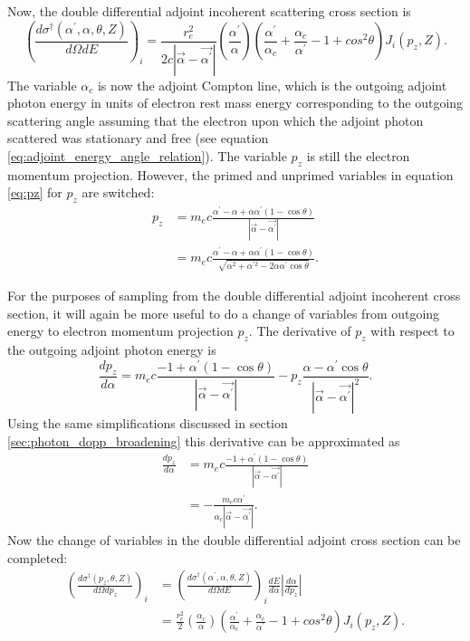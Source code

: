 Now, the double differential adjoint incoherent scattering cross section is
\begin{equation}
  \left(\frac{d\sigma^{\dagger}(\alpha^{'},\alpha,\theta,Z)}{d\Omega dE}
  \right)_i = \frac{r_e^2}{2c\left|\vec{\alpha}-\vec{\alpha^{'}}\right|}
  \left(\frac{\alpha^{'}}{\alpha}\right)\left(\frac{\alpha^{'}}{\alpha_c} +
  \frac{\alpha_c}{\alpha^{'}} - 1 + cos^2\theta \right) J_i(p_z,Z).
\end{equation}
The variable $\alpha_c$ is now the adjoint Compton line, which is the outgoing
adjoint photon energy in units of electron rest mass energy corresponding to
the outgoing scattering angle assuming that the electron upon which the adjoint
photon scattered was stationary and free (see equation 
\ref{eq:adjoint_energy_angle_relation}). The variable $p_z$ is still the 
electron momentum projection. However, the primed and unprimed variables in 
equation \ref{eq:pz} for $p_z$ are switched:
\begin{align}
  p_z & = m_ec \frac{\alpha^{'}-\alpha + \alpha\alpha^{'}(1-\cos{\theta})}
  {\left|\vec{\alpha}-\vec{\alpha^{'}}\right|} \nonumber \\
  & = m_ec \frac{\alpha^{'}-\alpha + \alpha\alpha^{'}(1-\cos{\theta})}
  {\sqrt{\alpha^2 + \alpha^{'2} - 2\alpha\alpha^{'}\cos{\theta}}}. \nonumber
\end{align}

For the purposes of sampling from the double differential adjoint incoherent
cross section, it will again be more useful to do a change of variables from
outgoing energy to electron momentum projection $p_z$. The derivative of $p_z$
with respect to the outgoing adjoint photon energy is
\begin{equation}
  \frac{dp_z}{d\alpha} = m_ec\frac{-1 + \alpha^{'}(1-\cos{\theta})}
       {\left|\vec{\alpha}-\vec{\alpha^{'}}\right|} - 
       p_z\frac{\alpha-\alpha^{'}\cos{\theta}}
       {\left|\vec{\alpha}-\vec{\alpha^{'}}\right|^2}.
\end{equation}
Using the same simplifications discussed in section 
\ref{sec:photon_dopp_broadening} this derivative can be approximated as
\begin{align}
  \frac{dp_z}{d\alpha} & = m_ec\frac{-1 + \alpha^{'}(1-\cos{\theta})}
       {\left|\vec{\alpha}-\vec{\alpha^{'}}\right|} \nonumber \\
   & = - \frac{m_ec \alpha^{'}}
       {\alpha_c\left|\vec{\alpha}-\vec{\alpha^{'}}\right|}.
\end{align}
Now the change of variables in the double differential adjoint cross section
can be completed:
\begin{align}
  \left(\frac{d\sigma^{\dagger}(p_z,\theta,Z)}{d\Omega dp_z} \right)_i & = 
  \left(\frac{d\sigma^{\dagger}(\alpha^{'},\alpha,\theta,Z)}{d\Omega dE}
  \right)_i \frac{dE}{d\alpha} \left|\frac{d\alpha}{dp_z}\right| \nonumber \\
  & = \frac{r_e^2}{2} \left(\frac{\alpha_c}{\alpha}\right)
  \left(\frac{\alpha^{'}}{\alpha_c} + \frac{\alpha_c}{\alpha^{'}} - 1 + 
  cos^2\theta \right) J_i(p_z,Z).
\end{align}

